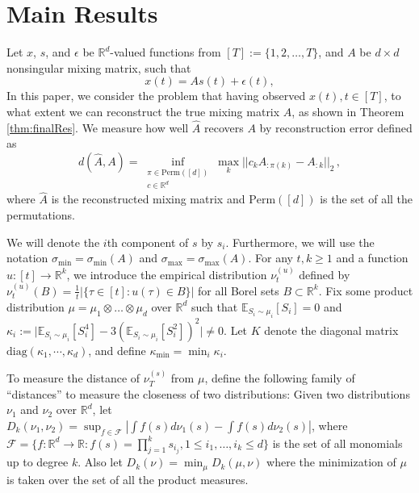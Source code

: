 \documentclass{article} %
\newcommand{\real}{\mathbb{R}}
\newcommand{\E}{\mathbb{E}}
\theoremstyle{definition}
\begin{document}
\section{Main Results}
\label{sec:main}
Let $x$, $s$, and $\epsilon$ be $\real^d$-valued functions from $[T]:=\{1,2,\ldots,T\}$, and $A$ be $d\times d$ nonsingular mixing matrix, such that 
\begin{equation}
\label{eq:ICA}
x(t) = As(t)+\epsilon(t),
\end{equation}
In this paper, we consider the problem that having observed $x(t), t\in [T]$, to what extent we can reconstruct the true mixing matrix $A$, as shown in Theorem \ref{thm:finalRes}.
We measure how well $\hat{A}$ recovers $A$ by reconstruction error defined as
\[
d(\hat{A}, A) = \inf_{
		\substack{\pi \in \mathrm{Perm}([d]) \\ c\in \real^d}} 
		\max_{k} || c_k A_{:\pi(k)} - A_{:k} ||_2\,,
\]
where $\hat{A}$ is the reconstructed mixing matrix and $\mathrm{Perm}([d])$ is the set of all the permutations. 

We will denote the $i$th component of $s$ by $s_i$. 
Furthermore, we will use the notation $\sigma_{\min}=\sigma_{\min}(A)$ and
$\sigma_{\max}=\sigma_{\max}(A)$.
For any $t,k \ge 1$ and a function $u:[t] \to \real^k$, we introduce the empirical distribution $\nu_t^{(u)}$ defined by
$\nu_t^{(u)}(B)=\tfrac{1}{t}|\{\tau \in [t]: u(\tau) \in B\}|$ for all Borel sets $B \subset \real^k$.
Fix some product distribution $\mu= \mu_1\otimes \ldots \otimes \mu_d$ over $\real^d$ 
such that $\E_{S_i\sim\mu_i}[S_i]=0$ and $\kappa_i := \vert \E_{S_i\sim \mu_i}[S_i^4] - 3\left(\E_{S_i\sim \mu_i}[S_i^2]\right)^2 \vert \neq 0$. Let
$K$ denote the diagonal matrix $\text{diag}(\kappa_1,\cdots,\kappa_d)$, and define $\kappa_{\min}=\min_{i} \kappa_i$.

To measure the distance of $\nu_T^{(s)}$ from $\mu$, define the following family of ``distances'' to measure the closeness of two distributions: Given two distributions $\nu_1$ and $\nu_2$ over $\real^d$, let $D_k(\nu_1,\nu_2) = \sup_{f\in\mathcal{F}} |\int f(s)d\nu_1(s) - \int f(s)d\nu_2(s)|$, where $\mathcal{F}=\{f:\real^d \to \real : f(s)=\prod_{j=1}^k s_{i_j}, 1 \le i_1,\ldots,i_k \le d\}$ is the set of all monomials up to degree $k$.
Also let $D_k(\nu)  = \min_{\mu} D_k(\mu, \nu)$ where the minimization of $\mu$ is taken over the set of all the product measures. 
\end{document}
